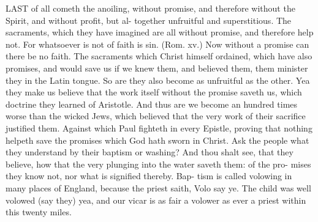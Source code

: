 \documentclass{custom}
\begin{document}
LAST of all cometh the anoiling, without promise, and 
therefore without the Spirit, and without profit, but al- 
together unfruitful and superstitious. The sacraments, 
which they have imagined are all without promise, and 
therefore help not. For whatsoever is not of faith is sin. 
(Rom. xv.) Now without a promise can there be no
faith. The sacraments which Christ himself ordained,
which have also promises, and would save us if we knew
them, and believed them, them minister they in the Latin
tongue. So are they also become as unfruitful as the
other. Yea they make us believe that the work itself 
without the promise saveth us, which doctrine they learned 
of Aristotle. And thus are we become an hundred times 
worse than the wicked Jews, which believed that the very 
work of their sacrifice justified them. Against which 
Paul fighteth in every Epistle, proving that nothing helpeth 
save the promises which God hath sworn in Christ. 
Ask the people what they understand by their baptism or 
washing? And thou shalt see, that they believe, how that 
the very plunging into the water saveth them: of the pro- 
mises they know not, nor what is signified thereby. Bap- 
tism is called volowing in many places of England, because 
the priest saith, Volo say ye. The child was well volowed 
(say they) yea, and our vicar is as fair a volower as ever a 
priest within this twenty miles. 
\end{document}
